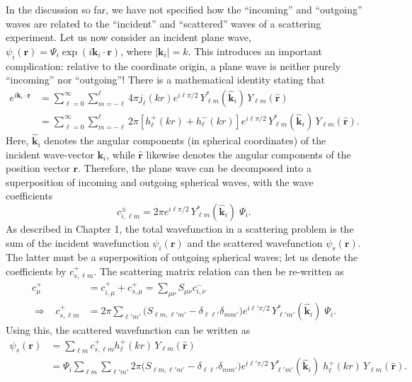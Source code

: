 \documentclass[pra,12pt]{revtex4}
\begin{document}
In the discussion so far, we have not specified how the ``incoming''
and ``outgoing'' waves are related to the ``incident'' and
``scattered'' waves of a scattering experiment.  Let us now consider
an incident plane wave, $\psi_i(\mathbf{r}) = \Psi_i
\exp(i\mathbf{k}_i\cdot \mathbf{r})$, where $|\mathbf{k}_i| = k$.
This introduces an important complication: relative to the coordinate
origin, a plane wave is neither purely ``incoming'' nor ``outgoing''!
There is a mathematical identity stating that
$$\begin{aligned}e^{i\mathbf{k}_i \cdot \mathbf{r}} &= \sum_{\ell=0}^\infty \sum_{m=-\ell}^\ell 4 \pi j_{\ell}(kr) e^{i\ell\pi/2} \, Y_{\ell m}^*(\hat{\mathbf{k}}_i) \, Y_{\ell m}(\hat{\mathbf{r}})\\ &= \sum_{\ell=0}^\infty \sum_{m=-\ell}^\ell 2 \pi \left[h_{\ell}^+(kr) + h_{\ell}^-(kr)\right] e^{i\ell\pi/2} \, Y_{\ell m}^*(\hat{\mathbf{k}}_i) \, Y_{\ell m}(\hat{\mathbf{r}}).\end{aligned}$$
Here, $\hat{\mathbf{k}}_i$ denotes the angular components (in
spherical coordinates) of the incident wave-vector $\mathbf{k}_i$,
while $\hat{\mathbf{r}}$ likewise denotes the angular components of
the position vector $\mathbf{r}$.  Therefore, the plane wave can be
decomposed into a superposition of incoming and outgoing spherical
waves, with the wave coefficients
$$c^{\pm}_{i, \ell m} = 2 \pi e^{i\ell\pi/2} \, Y_{\ell m}^*(\hat{\mathbf{k}}_i)\; \Psi_i.$$
As described in Chapter 1, the total wavefunction in a scattering
problem is the sum of the incident wavefunction $\psi_i(\mathbf{r})$
and the scattered wavefunction $\psi_s(\mathbf{r})$.  The latter must
be a superposition of outgoing spherical waves; let us denote the
coefficients by $c^+_{s,\ell m}$.  The scattering matrix relation can
then be re-written as
$$\begin{aligned}c^+_\mu &= c^+_{i,\mu} + c^+_{s,\mu} = \sum_{\mu\nu} S_{\mu\nu} c^-_{i,\nu} \\ \Rightarrow \;\;\; c^+_{s,\ell m} &= 2 \pi \sum_{\ell' m'} \Big(S_{\ell m, \ell' m'} - \delta_{\ell \ell'}\delta_{mm'}\Big) e^{i\ell'\pi/2} \, Y_{\ell' m'}^*(\hat{\mathbf{k}}_i)\; \Psi_i. \end{aligned}$$
Using this, the scattered wavefunction can be written as
$$\begin{aligned}\psi_s(\mathbf{r}) &= \sum_{\ell m} c^+_{s,\ell m} h_{\ell}^+(kr) \, Y_{\ell m}(\hat{\mathbf{r}}) \\ &= \Psi_i \sum_{\ell m} \sum_{\ell' m'} 2 \pi \Big(S_{\ell m, \ell' m'} - \delta_{\ell \ell'}\delta_{mm'}\Big) e^{i\ell'\pi/2} \, Y_{\ell' m'}^*(\hat{\mathbf{k}}_i)\; h_{\ell}^+(kr) \, Y_{\ell m}(\hat{\mathbf{r}}).\end{aligned}$$
\end{document}
